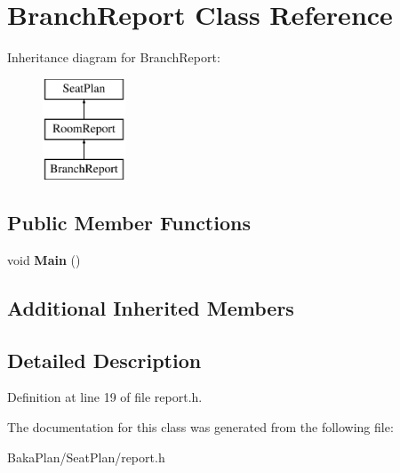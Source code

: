 \hypertarget{classBranchReport}{\section{Branch\-Report Class Reference}
\label{classBranchReport}
}
Inheritance diagram for Branch\-Report\-:\begin{figure}[H]
\begin{center}
\leavevmode
\includegraphics[height=3.000000cm]{classBranchReport}
\end{center}
\end{figure}
\subsection*{Public Member Functions}
\begin{DoxyCompactItemize}
\item 
\hypertarget{classBranchReport_acafa37b5ff6b8886333cc5ab8bb53fad}{void {\bfseries Main} ()}\label{classBranchReport_acafa37b5ff6b8886333cc5ab8bb53fad}

\end{DoxyCompactItemize}
\subsection*{Additional Inherited Members}


\subsection{Detailed Description}


Definition at line 19 of file report.\-h.



The documentation for this class was generated from the following file\-:\begin{DoxyCompactItemize}
\item 
Baka\-Plan/\-Seat\-Plan/report.\-h\end{DoxyCompactItemize}
